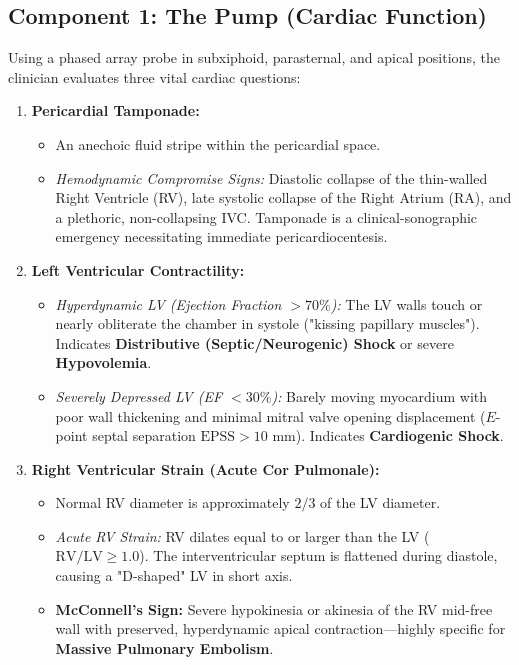 \documentclass[11pt,a4paper]{article}
\begin{document}
\subsection{Component 1: The Pump (Cardiac Function)}
Using a phased array probe in subxiphoid, parasternal, and apical positions, the clinician evaluates three vital cardiac questions:
\begin{enumerate}[leftmargin=2em]
    \item \textbf{Pericardial Tamponade:}
    \begin{itemize}
        \item An anechoic fluid stripe within the pericardial space.
        \item \textit{Hemodynamic Compromise Signs:} Diastolic collapse of the thin-walled Right Ventricle (RV), late systolic collapse of the Right Atrium (RA), and a plethoric, non-collapsing IVC. Tamponade is a clinical-sonographic emergency necessitating immediate pericardiocentesis.
    \end{itemize}
    \item \textbf{Left Ventricular Contractility:}
    \begin{itemize}
        \item \textit{Hyperdynamic LV (Ejection Fraction $> 70\%$):} The LV walls touch or nearly obliterate the chamber in systole ("kissing papillary muscles"). Indicates \textbf{Distributive (Septic/Neurogenic) Shock} or severe \textbf{Hypovolemia}.
        \item \textit{Severely Depressed LV (EF $< 30\%$):} Barely moving myocardium with poor wall thickening and minimal mitral valve opening displacement ($E$-point septal separation $\text{EPSS} > 10\text{ mm}$). Indicates \textbf{Cardiogenic Shock}.
    \end{itemize}
    \item \textbf{Right Ventricular Strain (Acute Cor Pulmonale):}
    \begin{itemize}
        \item Normal RV diameter is approximately $2/3$ of the LV diameter.
        \item \textit{Acute RV Strain:} RV dilates equal to or larger than the LV ($\text{RV}/\text{LV} \ge 1.0$). The interventricular septum is flattened during diastole, causing a "D-shaped" LV in short axis.
        \item \textbf{McConnell's Sign:} Severe hypokinesia or akinesia of the RV mid-free wall with preserved, hyperdynamic apical contraction—highly specific for \textbf{Massive Pulmonary Embolism}.
    \end{itemize}
\end{enumerate}
\end{document}
